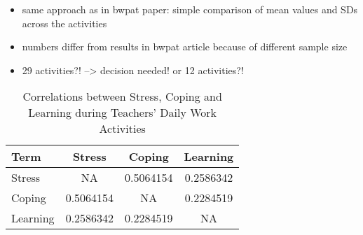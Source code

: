 \documentclass[
]{article}
\providecommand{\tightlist}{%
  \setlength{\itemsep}{0pt}\setlength{\parskip}{0pt}}
\begin{document}
\begin{itemize}
\tightlist
\item
  same approach as in bwpat paper: simple comparison of mean values and
  SDs across the activities
\item
  numbers differ from results in bwpat article because of different
  sample size
\item
  29 activities?! --\textgreater{} decision needed! or 12 activities?!
\end{itemize}

\begingroup\fontsize{9}{11}\selectfont

\begin{longtable}[t]{lccc}
\caption{\label{tab:rq1 correlations kable table}Correlations between Stress, Coping and Learning during Teachers' Daily Work Activities}\\
\toprule
Term & Stress & Coping & Learning\\
\midrule
Stress & NA & 0.5064154 & 0.2586342\\
Coping & 0.5064154 & NA & 0.2284519\\
Learning & 0.2586342 & 0.2284519 & NA\\
\bottomrule
\end{longtable}
\endgroup{}

\begingroup\fontsize{9}{11}\selectfont
\end{document}
